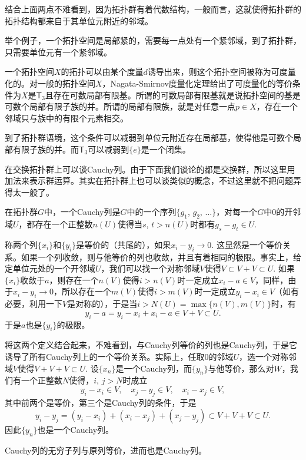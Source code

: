 结合上面两点不难看到，因为拓扑群有着代数结构，一般而言，这就使得拓扑群的拓扑结构都来自于其单位元附近的邻域。

举个例子，一个拓扑空间是局部紧的，需要每一点处有一个紧邻域，到了拓扑群，只需要单位元有一个紧邻域。

\begin{para}
一个拓扑空间$X$的拓扑可以由某个度量$d$诱导出来，则这个拓扑空间被称为可度量化的。对一般的拓扑空间$X$，Nagata-Smirnov度量化定理给出了可度量化的等价条件为$X$是$\mathsf{T}_3$且存在可数局部有限基。所谓的可数局部有限基就是说拓扑空间的基是可数个局部有限子族的并。所谓的局部有限族，就是对任意一点$p\in X$，存在一个邻域只与族中的有限个元素相交。

到了拓扑群语境，这个条件可以减弱到单位元附近存在局部基，使得他是可数个局部有限子族的并。而$\mathsf{T}_3$可以减弱到$\{e\}$是一个闭集。
\end{para}

\begin{para}
在交换拓扑群上可以谈Cauchy列。由于下面我们谈论的都是交换群，所以这里用加法来表示群运算。其实在拓扑群上也可以谈类似的概念，不过这里就不把问题弄得太一般了。

在拓扑群$G$中，一个Cauchy列是$G$中的一个序列$\{g_1$, $g_2$, $\dots\}$，对每一个$G$中$0$的开邻域$U$，都存在一个正整数$n(U)$使得当$s$, $t>n(U)$时都有$g_s-g_t\in U$. 

称两个列$\{x_i\}$和$\{y_i\}$是等价的（共尾的），如果$x_i-y_i\to 0$. 这显然是一个等价关系。如果一个列收敛，则与他等价的列也收敛，并且有着相同的极限。事实上，给定单位元处的一个开邻域$U$，我们可以找一个对称邻域$V$使得$V\subset V+V\subset U$. 如果$\{x_i\}$收敛于$a$，则存在一个$n(V)$使得$i>n(V)$时一定成立$x_i-a\in V$，同样，由于$x_i-y_i\to 0$，所以存在一个$m(V)$使得$i>m(V)$时一定成立$y_i-x_i\in V$（如有必要，利用一下$V$是对称的），于是当$i>N(U)=\max\{n(V),m(V)\}$时，有
\[
	y_i-a=y_i-x_i+x_i-a\in V+V\subset U.
\]
于是$a$也是$\{y_i\}$的极限。

将这两个定义结合起来，不难看到，与Cauchy列等价的列也是Cauchy列，于是它诱导了所有Cauchy列上的一个等价关系。实际上，任取$0$的邻域$U$，选一个对称邻域$V$使得$V+V+V\subset U$. 设$\{x_n\}$是一个Cauchy列，而$\{y_n\}$与他等价，那么对$W$，我们有一个正整数$N$使得，$i$, $j>N$时成立
\[
	y_i-x_i\in V,\quad x_j-y_j\in V,\quad x_i-x_j\in V,
\]
其中前两个是等价，第三个是Cauchy列的条件，于是
\[
	y_i-y_j=(y_i-x_i)+(x_i-x_j)+(x_j-y_j)\subset V+V+V\subset U.
\]
因此$\{y_n\}$也是一个Cauchy列。

\end{para}

\begin{lem}
	Cauchy列的无穷子列与原列等价，进而也是Cauchy列。
\end{lem}


